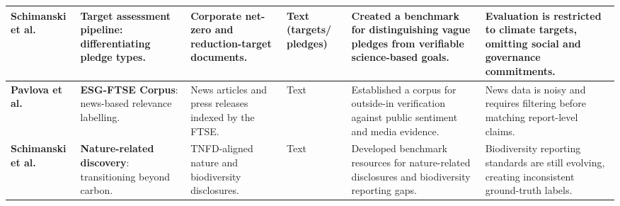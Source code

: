 \begin{landscape}
\begin{table}[p]
\begin{tabularx}{\linewidth}{|p{1.8cm}|X|X|p{1.8cm}|X|X|}
\textbf{Schimanski et al.} \parencite{tobias_schimanski_241ada20} & \textbf{Target assessment pipeline}: differentiating pledge types. & Corporate net-zero and reduction-target documents. & Text (targets/ pledges) & Created a benchmark for distinguishing vague pledges from verifiable science-based goals. & Evaluation is restricted to climate targets, omitting social and governance commitments. \\ \hline
\textbf{Pavlova et al.} \parencite{mariya_pavlova_259be499} & \textbf{ESG-FTSE Corpus}: news-based relevance labelling. & News articles and press releases indexed by the FTSE. & Text & Established a corpus for outside-in verification against public sentiment and media evidence. & News data is noisy and requires filtering before matching report-level claims. \\ \hline
\textbf{Schimanski et al.} \parencite{tobias_schimanski_3549ff9f} & \textbf{Nature-related discovery}: transitioning beyond carbon. & TNFD-aligned nature and biodiversity disclosures. & Text & Developed benchmark resources for nature-related disclosures and biodiversity reporting gaps. & Biodiversity reporting standards are still evolving, creating inconsistent ground-truth labels. \\ \hline
\end{tabularx}
\end{table}
\end{landscape}


